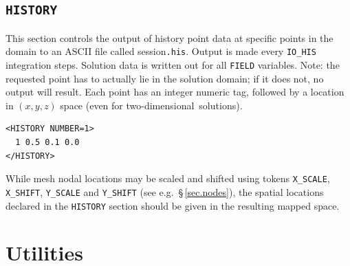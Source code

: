 \documentclass[11pt]{report}
\newcommand\twod{two-di\-men\-sion\-al}
\newcommand{\eg}{e.g.\ } \newcommand{\CC}{\mathrm{c.c.}}
\begin{document}
\subsection{\texttt{HISTORY}}
\label{sec.historyy}

This section controls the output of history point data at specific
points in the domain to an ASCII file called session\verb|.his|.
Output is made every \verb|IO_HIS| integration steps.  Solution data
is written out for all \verb|FIELD| variables.  Note: the requested
point has to actually lie in the solution domain; if it does not, no
output will result. Each point has an integer numeric tag, followed by
a location in $(x,y,z)$ space (even for \twod\ solutions).
%
{\small
\begin{verbatim}
<HISTORY NUMBER=1>
  1	0.5	0.1	0.0
</HISTORY>
\end{verbatim}
}
%
While mesh nodal locations may be scaled and shifted using tokens
\verb|X_SCALE|, \verb|X_SHIFT|, \verb|Y_SCALE| and \verb|Y_SHIFT| (see
\eg \S\,\ref{sec.nodes}), the spatial locations declared in the
\verb|HISTORY| section should be given in the resulting mapped space.

\section{Utilities}
\label{sec.utilities}
\end{document}
